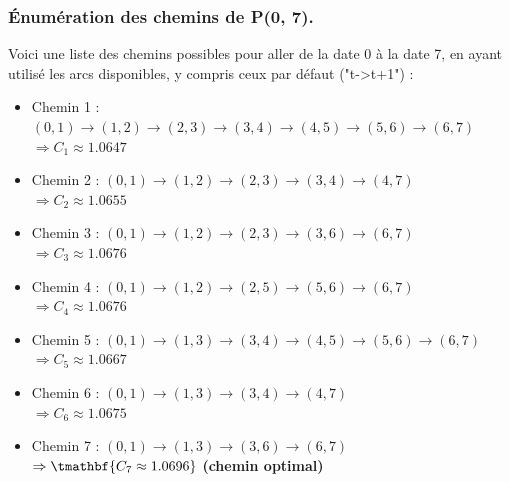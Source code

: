 \documentclass[a4paper,11pt]{article}
\begin{document}
    \subsubsection{Énumération des chemins de P(0, 7).}
    Voici une liste des chemins possibles pour aller de la date 0 à la date 7, en ayant utilisé les arcs disponibles, y compris ceux par défaut ("t->t+1") :


\begin{itemize}
    \item Chemin 1 : $(0,1) \to (1,2) \to (2,3) \to (3,4) \to (4,5) \to (5,6) \to (6,7)$ \\
    \hspace{0.5cm} $\Rightarrow C_1 \approx 1.0647$
    \vspace{0.3cm}

    \item Chemin 2 : $(0,1) \to (1,2) \to (2,3) \to (3,4) \to (4,7)$ \\
    \hspace{0.5cm} $\Rightarrow C_2 \approx 1.0655$
    \vspace{0.3cm}

    \item Chemin 3 : $(0,1) \to (1,2) \to (2,3) \to (3,6) \to (6,7)$ \\
    \hspace{0.5cm} $\Rightarrow C_3 \approx 1.0676$
    \vspace{0.3cm}

    \item Chemin 4 : $(0,1) \to (1,2) \to (2,5) \to (5,6) \to (6,7)$ \\
    \hspace{0.5cm} $\Rightarrow C_4 \approx 1.0676$
    \vspace{0.3cm}

    \item Chemin 5 : $(0,1) \to (1,3) \to (3,4) \to (4,5) \to (5,6) \to (6,7)$ \\
    \hspace{0.5cm} $\Rightarrow C_5 \approx 1.0667$
    \vspace{0.3cm}

    \item Chemin 6 : $(0,1) \to (1,3) \to (3,4) \to (4,7)$ \\
    \hspace{0.5cm} $\Rightarrow C_6 \approx 1.0675$
    \vspace{0.3cm}

    \item Chemin 7 : $(0,1) \to (1,3) \to (3,6) \to (6,7)$ \\
    \hspace{0.5cm} $\Rightarrow \tmathbf{C_7 \approx 1.0696}$ \textbf{(chemin optimal)}
    \vspace{0.3cm}


\end{itemize}
\end{document}
